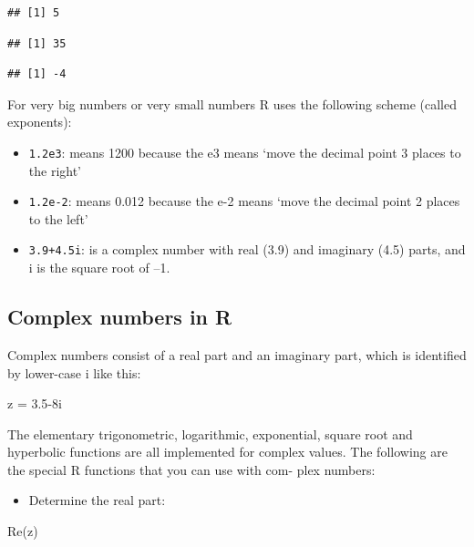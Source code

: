 \documentclass[
]{book}
\newenvironment{Shaded}{\begin{snugshade}}{\end{snugshade}}
\newcommand{\FloatTok}[1]{\textcolor[rgb]{0.00,0.00,0.81}{#1}}
\newcommand{\FunctionTok}[1]{\textcolor[rgb]{0.00,0.00,0.00}{#1}}
\newcommand{\NormalTok}[1]{#1}
\newcommand{\OtherTok}[1]{\textcolor[rgb]{0.56,0.35,0.01}{#1}}
\newcommand{\SpecialCharTok}[1]{\textcolor[rgb]{0.00,0.00,0.00}{#1}}
\providecommand{\tightlist}{%
  \setlength{\itemsep}{0pt}\setlength{\parskip}{0pt}}
\theoremstyle{definition}
\theoremstyle{definition}
\theoremstyle{definition}
\theoremstyle{definition}
\theoremstyle{remark}
\begin{document}
\begin{verbatim}
## [1] 5
\end{verbatim}

\begin{verbatim}
## [1] 35
\end{verbatim}

\begin{verbatim}
## [1] -4
\end{verbatim}

For very big numbers or very small numbers R uses the following scheme (called exponents):

\begin{itemize}
\tightlist
\item
  \texttt{1.2e3}: means 1200 because the e3 means `move the decimal point 3 places to the right'
\item
  \texttt{1.2e-2}: means 0.012 because the e-2 means `move the decimal point 2 places to the left'
\item
  \texttt{3.9+4.5i}: is a complex number with real (3.9) and imaginary (4.5) parts, and i is the square root of --1.
\end{itemize}

\hypertarget{complex-numbers-in-r}{%
\subsection{Complex numbers in R}\label{complex-numbers-in-r}}

Complex numbers consist of a real part and an imaginary part, which is identified by lower-case i like this:

\begin{Shaded}
\begin{Highlighting}[]
\NormalTok{z }\OtherTok{=} \FloatTok{3.5}\SpecialCharTok{{-}}\NormalTok{8i}
\end{Highlighting}
\end{Shaded}

The elementary trigonometric, logarithmic, exponential, square root and hyperbolic functions are all
implemented for complex values. The following are the special R functions that you can use with com-
plex numbers:

\begin{itemize}
\tightlist
\item
  Determine the real part:
\end{itemize}

\begin{Shaded}
\begin{Highlighting}[]
\FunctionTok{Re}\NormalTok{(z)}
\end{Highlighting}
\end{Shaded}
\end{document}
